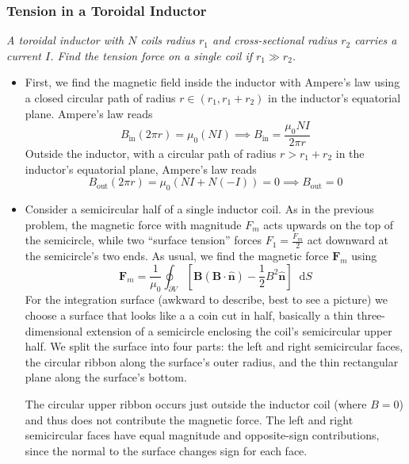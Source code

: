 \documentclass[11pt, a4paper]{article}
\newcommand{\diff}{\mathop{}\!\mathrm{d}} %
\renewcommand{\vec}[1]{\bm{#1}} %
\newcommand{\uvec}[1]{\hat{\vec{#1}}} %
\newcommand{\B}{\vec{B}} %
\begin{document}
\subsubsection{Tension in a Toroidal Inductor}
\textit{A toroidal inductor with $ N $ coils radius $ r_{1} $ and cross-sectional radius $ r_{2} $ carries a current $ I $. Find the tension force on a single coil if $ r_{1} \gg r_{2} $.}
\begin{itemize}
	\item First, we find the magnetic field inside the inductor with Ampere's law using a closed circular path of radius $ r \in (r_{1}, r_{1} + r_{2}) $ in the inductor's equatorial plane. Ampere's law reads
	\begin{equation*}
		B_{\text{in}} (2\pi r) = \mu_{0} (NI) \implies B_{\text{in}} = \frac{\mu_{0}NI}{2\pi r}
	\end{equation*}
	Outside the inductor, with a circular path of radius $ r > r_{1} + r_{2} $ in the inductor's equatorial plane, Ampere's law reads
	\begin{equation*}
		B_{\text{out}} (2\pi r) = \mu_{0} (NI + N(-I)) = 0 \implies B_{\text{out}} = 0
	\end{equation*}
	
	\item Consider a semicircular half of a single inductor coil. As in the previous problem, the magnetic force with magnitude $ F_{m} $ acts upwards on the top of the semicircle, while two ``surface tension'' forces $ F_{1} = \frac{F_{m}}{2} $ act downward at the semicircle's two ends. As usual, we find the magnetic force $ \vec{F}_{m} $ using
	\begin{equation*}
		\vec{F}_{m} = \frac{1}{\mu_{0}}\oint_{\partial V}\left [\B(\B \cdot \uvec{n}) - \frac{1}{2}B^{2}\uvec{n}\right ] \diff S
	\end{equation*}
	For the integration surface (awkward to describe, best to see a picture) we choose a surface that looks like a a coin cut in half, basically a thin three-dimensional extension of a semicircle enclosing the coil's semicircular upper half. We split the surface into four parts: the left and right semicircular faces, the circular ribbon along the surface's outer radius, and the thin rectangular plane along the surface's bottom. 
	
	The circular upper ribbon occurs just outside the inductor coil (where $ B = 0 $) and thus does not contribute the magnetic force. The left and right semicircular faces have equal magnitude and opposite-sign contributions, since the normal to the surface changes sign for each face. 
	

\end{itemize}
\end{document}
